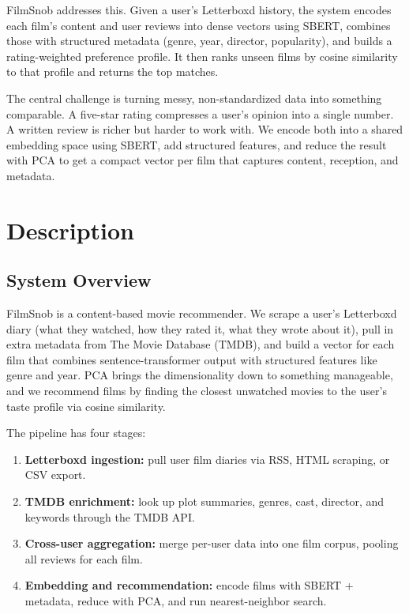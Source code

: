 \documentclass[sigconf,nonacm]{acmart}
\begin{document}
FilmSnob addresses this. Given a user's Letterboxd history, the system encodes each film's content and user reviews into dense vectors using SBERT, combines those with structured metadata (genre, year, director, popularity), and builds a rating-weighted preference profile. It then ranks unseen films by cosine similarity to that profile and returns the top matches.

The central challenge is turning messy, non-standardized data into something comparable. A five-star rating compresses a user's opinion into a single number. A written review is richer but harder to work with. We encode both into a shared embedding space using SBERT, add structured features, and reduce the result with PCA to get a compact vector per film that captures content, reception, and metadata.

\section{Description}

\subsection{System Overview}

FilmSnob is a content-based movie recommender. We scrape a user's Letterboxd diary (what they watched, how they rated it, what they wrote about it), pull in extra metadata from The Movie Database (TMDB), and build a vector for each film that combines sentence-transformer output with structured features like genre and year. PCA brings the dimensionality down to something manageable, and we recommend films by finding the closest unwatched movies to the user's taste profile via cosine similarity.

The pipeline has four stages:
\begin{enumerate}
  \item \textbf{Letterboxd ingestion:} pull user film diaries via RSS, HTML scraping, or CSV export.
  \item \textbf{TMDB enrichment:} look up plot summaries, genres, cast, director, and keywords through the TMDB API.
  \item \textbf{Cross-user aggregation:} merge per-user data into one film corpus, pooling all reviews for each film.
  \item \textbf{Embedding and recommendation:} encode films with SBERT + metadata, reduce with PCA, and run nearest-neighbor search.
\end{enumerate}
\end{document}
